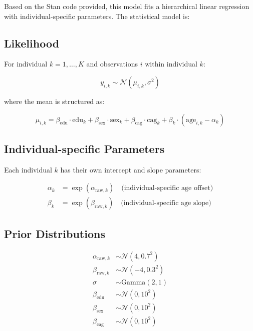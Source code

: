 \documentclass[12pt]{article}
\begin{document}
Based on the Stan code provided, this model fits a hierarchical linear regression with individual-specific parameters. The statistical model is:

\subsection{Likelihood}
For individual $k = 1, \ldots, K$ and observations $i$ within individual $k$:

\begin{equation}
y_{i,k} \sim \mathcal{N}(\mu_{i,k}, \sigma^2)
\end{equation}

where the mean is structured as:

\begin{equation}
\mu_{i,k} = \beta_{\text{edu}} \cdot \text{edu}_k + \beta_{\text{sex}} \cdot \text{sex}_k + \beta_{\text{cag}} \cdot \text{cag}_k + \beta_k \cdot (\text{age}_{i,k} - \alpha_k)
\end{equation}

\subsection{Individual-specific Parameters}
Each individual $k$ has their own intercept and slope parameters:

\begin{align}
\alpha_k &= \exp(\alpha_{\text{raw},k}) \quad \text{(individual-specific age offset)} \\
\beta_k &= \exp(\beta_{\text{raw},k}) \quad \text{(individual-specific age slope)}
\end{align}

\subsection{Prior Distributions}

\begin{align}
\alpha_{\text{raw},k} &\sim \mathcal{N}(4, 0.7^2) \\
\beta_{\text{raw},k} &\sim \mathcal{N}(-4, 0.3^2) \\
\sigma &\sim \text{Gamma}(2, 1) \\
\beta_{\text{edu}} &\sim \mathcal{N}(0, 10^2) \\
\beta_{\text{sex}} &\sim \mathcal{N}(0, 10^2) \\
\beta_{\text{cag}} &\sim \mathcal{N}(0, 10^2)
\end{align}
\end{document}
